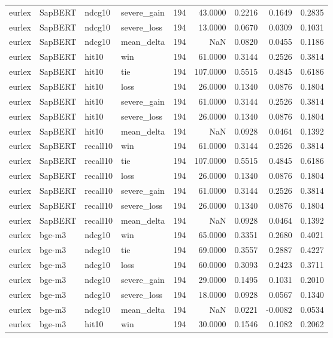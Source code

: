 \begin{tabular}{llllrrrrr}
eurlex & SapBERT & ndcg10 & severe\_gain & 194 & 43.0000 & 0.2216 & 0.1649 & 0.2835 \\
eurlex & SapBERT & ndcg10 & severe\_loss & 194 & 13.0000 & 0.0670 & 0.0309 & 0.1031 \\
eurlex & SapBERT & ndcg10 & mean\_delta & 194 & NaN & 0.0820 & 0.0455 & 0.1186 \\
eurlex & SapBERT & hit10 & win & 194 & 61.0000 & 0.3144 & 0.2526 & 0.3814 \\
eurlex & SapBERT & hit10 & tie & 194 & 107.0000 & 0.5515 & 0.4845 & 0.6186 \\
eurlex & SapBERT & hit10 & loss & 194 & 26.0000 & 0.1340 & 0.0876 & 0.1804 \\
eurlex & SapBERT & hit10 & severe\_gain & 194 & 61.0000 & 0.3144 & 0.2526 & 0.3814 \\
eurlex & SapBERT & hit10 & severe\_loss & 194 & 26.0000 & 0.1340 & 0.0876 & 0.1804 \\
eurlex & SapBERT & hit10 & mean\_delta & 194 & NaN & 0.0928 & 0.0464 & 0.1392 \\
eurlex & SapBERT & recall10 & win & 194 & 61.0000 & 0.3144 & 0.2526 & 0.3814 \\
eurlex & SapBERT & recall10 & tie & 194 & 107.0000 & 0.5515 & 0.4845 & 0.6186 \\
eurlex & SapBERT & recall10 & loss & 194 & 26.0000 & 0.1340 & 0.0876 & 0.1804 \\
eurlex & SapBERT & recall10 & severe\_gain & 194 & 61.0000 & 0.3144 & 0.2526 & 0.3814 \\
eurlex & SapBERT & recall10 & severe\_loss & 194 & 26.0000 & 0.1340 & 0.0876 & 0.1804 \\
eurlex & SapBERT & recall10 & mean\_delta & 194 & NaN & 0.0928 & 0.0464 & 0.1392 \\
eurlex & bge-m3 & ndcg10 & win & 194 & 65.0000 & 0.3351 & 0.2680 & 0.4021 \\
eurlex & bge-m3 & ndcg10 & tie & 194 & 69.0000 & 0.3557 & 0.2887 & 0.4227 \\
eurlex & bge-m3 & ndcg10 & loss & 194 & 60.0000 & 0.3093 & 0.2423 & 0.3711 \\
eurlex & bge-m3 & ndcg10 & severe\_gain & 194 & 29.0000 & 0.1495 & 0.1031 & 0.2010 \\
eurlex & bge-m3 & ndcg10 & severe\_loss & 194 & 18.0000 & 0.0928 & 0.0567 & 0.1340 \\
eurlex & bge-m3 & ndcg10 & mean\_delta & 194 & NaN & 0.0221 & -0.0082 & 0.0534 \\
eurlex & bge-m3 & hit10 & win & 194 & 30.0000 & 0.1546 & 0.1082 & 0.2062 \\

\end{tabular}
